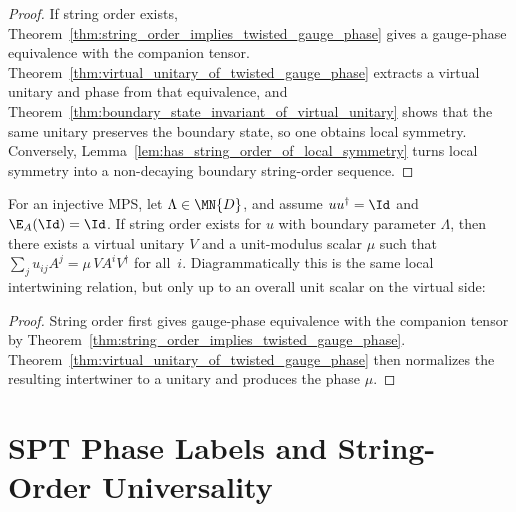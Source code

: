 \begin{proof}
    \leanok
    If string order exists, Theorem~\ref{thm:string_order_implies_twisted_gauge_phase}
    gives a gauge-phase equivalence with the companion tensor.
    Theorem~\ref{thm:virtual_unitary_of_twisted_gauge_phase} extracts a virtual
    unitary and phase from that equivalence, and
    Theorem~\ref{thm:boundary_state_invariant_of_virtual_unitary} shows that the
    same unitary preserves the boundary state, so one obtains local symmetry.
    Conversely, Lemma~\ref{lem:has_string_order_of_local_symmetry} turns local
    symmetry into a non-decaying boundary string-order sequence.
\end{proof}

\begin{theorem}%
    \label{thm:virtual_unitary_of_string_order}
    \leanok
    For an injective MPS, let $\Lambda \in \MN{D}$, and assume
    $u u^\dagger = \Id$ and $\E_A(\Id)=\Id$.
    If string order exists for $u$ with boundary parameter $\Lambda$, then
    there exists a virtual unitary $V$ and a unit-modulus scalar $\mu$ such that
    $\sum_j u_{ij} A^j = \mu\, V A^i V^\dagger$ for all~$i$.
    Diagrammatically this is the same local intertwining relation,
    but only up to an overall unit scalar on the virtual side:
    \begin{center}
    \end{center}
\end{theorem}

\begin{proof}
    \leanok
    String order first gives gauge-phase equivalence with the companion tensor by
    Theorem~\ref{thm:string_order_implies_twisted_gauge_phase}.
    Theorem~\ref{thm:virtual_unitary_of_twisted_gauge_phase} then normalizes the
    resulting intertwiner to a unitary and produces the phase $\mu$.
\end{proof}

\section{SPT Phase Labels and String-Order Universality}

